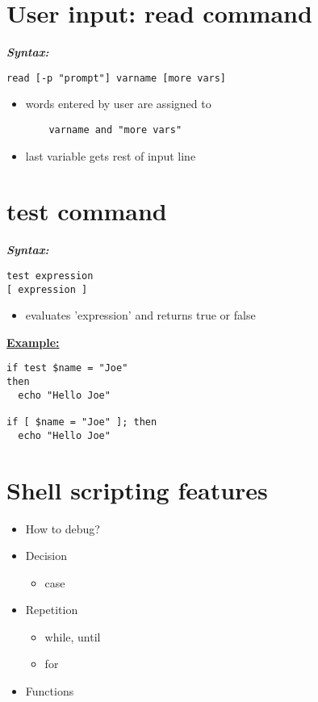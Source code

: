 \documentclass{report}
\begin{document}
\section{User input: read command}
\bigbreak \noindent
\textbf{\textit{Syntax:}}
\begin{verbatim}
read [-p "prompt"] varname [more vars] 
\end{verbatim}
\begin{itemize}
  \item words entered by user are assigned to
    \begin{verbatim}
    varname and "more vars"
    \end{verbatim}
  \item last variable gets rest of input line
\end{itemize}
\section{test command}
\bigbreak \noindent
\textbf{\textit{Syntax:}}
\begin{verbatim}
test expression
[ expression ]
\end{verbatim}
\begin{itemize}
  \item evaluates 'expression' and returns true or false
\end{itemize}
\bigbreak \noindent
\textbf{\underline{Example:}}
\begin{mdframed}
\begin{verbatim}
if test $name = "Joe"
then
  echo "Hello Joe"

if [ $name = "Joe" ]; then
  echo "Hello Joe"
\end{verbatim}
\end{mdframed}
\section{Shell scripting features}
\begin{itemize}
  \item How to debug?
  \item Decision
    \begin{itemize}[label=$\circ$]
      \item case
    \end{itemize}
  \item Repetition
    \begin{itemize}[label=$\circ$]
      \item while, until
      \item for
    \end{itemize}
  \item Functions
\end{itemize}
\end{document}
